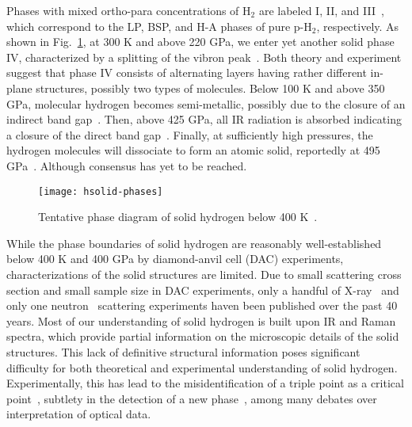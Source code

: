 
Phases with mixed ortho-para concentrations of H$_2$ are labeled I, II, and III~\cite{Dias2016,Dias2019}, which correspond to the LP, BSP, and H-A phases of pure p-H$_2$, respectively.
As shown in Fig.~\ref{fig:hsolid-phases}, at 300 K and above 220 GPa, we enter yet another solid phase IV, characterized by a splitting of the vibron peak~\cite{Zha2013}.
Both theory and experiment suggest that phase IV consists of alternating layers having rather different in-plane structures, possibly two types of molecules.
Below 100 K and above 350 GPa, molecular hydrogen becomes semi-metallic, possibly due to the closure of an indirect band gap~\cite{Eremets2019}.
Then, above 425 GPa, all IR radiation is absorbed indicating a closure of the direct band gap~\cite{Loubeyre2020}.
Finally, at sufficiently high pressures, the hydrogen molecules will dissociate to form an atomic solid, reportedly at 495 GPa~\cite{Silvera2017}. Although consensus has yet to be reached.

\begin{figure}[h]
\centering
\texttt{[image: hsolid-phases]}
\caption{Tentative phase diagram of solid hydrogen below 400 K~\cite{Dias2019}.}
\label{fig:hsolid-phases}
\end{figure}

While the phase boundaries of solid hydrogen are reasonably well-established below 400 K and 400 GPa by diamond-anvil cell (DAC) experiments, characterizations of the solid structures are limited. Due to small scattering cross section and small sample size in DAC experiments, only a handful of X-ray~\cite{Hazen1987,MAO1988,Loubeyre1996,Kawamura2002,Goncharenko2005a,Akahama2010,Ji2019} and only one neutron~\cite{Goncharenko2005a} scattering experiments haven been published over the past 40 years. Most of our understanding of solid hydrogen is built upon IR and Raman spectra, which provide partial information on the microscopic details of the solid structures. This lack of definitive structural information poses significant difficulty for both theoretical and experimental understanding of solid hydrogen. Experimentally, this has lead to the misidentification of a triple point as a critical point~\cite{Lorenzana1990,Cui1994}, subtlety in the detection of a new phase~\cite{Eremets2009,Howie2012}, among many debates over interpretation of optical data.

